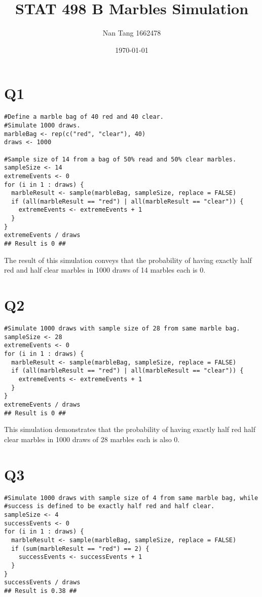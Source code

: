 \documentclass[12pt]{article}
\begin{document}
\title{STAT 498 B Marbles Simulation}
\author{Nan Tang 1662478}
\date{\today}
\maketitle

\section*{Q1}
\begin{verbatim}
#Define a marble bag of 40 red and 40 clear. 
#Simulate 1000 draws.
marbleBag <- rep(c("red", "clear"), 40)
draws <- 1000

#Sample size of 14 from a bag of 50% read and 50% clear marbles.
sampleSize <- 14
extremeEvents <- 0
for (i in 1 : draws) {
  marbleResult <- sample(marbleBag, sampleSize, replace = FALSE)
  if (all(marbleResult == "red") | all(marbleResult == "clear")) {
    extremeEvents <- extremeEvents + 1
  }
}
extremeEvents / draws
## Result is 0 ##
\end{verbatim}

\noindent The result of this simulation conveys that the probability of having exactly half red and half clear marbles in 1000 draws of 14 marbles each is 0. 


\section*{Q2}
\begin{verbatim}
#Simulate 1000 draws with sample size of 28 from same marble bag.
sampleSize <- 28
extremeEvents <- 0
for (i in 1 : draws) {
  marbleResult <- sample(marbleBag, sampleSize, replace = FALSE)
  if (all(marbleResult == "red") | all(marbleResult == "clear")) {
    extremeEvents <- extremeEvents + 1
  }
}
extremeEvents / draws
## Result is 0 ##
\end{verbatim}

\noindent This simulation demonstrates that the probability of having exactly half red half clear marbles in 1000 draws of 28 marbles each is also 0. 


\section*{Q3}
\begin{verbatim}
#Simulate 1000 draws with sample size of 4 from same marble bag, while 
#success is defined to be exactly half red and half clear. 
sampleSize <- 4
successEvents <- 0
for (i in 1 : draws) {
  marbleResult <- sample(marbleBag, sampleSize, replace = FALSE)
  if (sum(marbleResult == "red") == 2) {
    successEvents <- successEvents + 1
  }
}
successEvents / draws
## Result is 0.38 ##
\end{verbatim}
\end{document}
